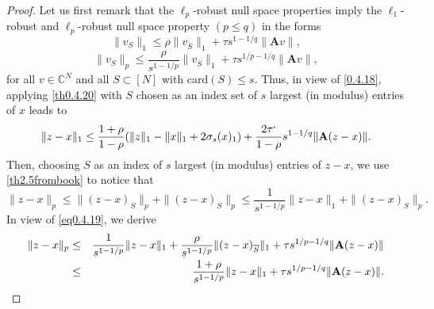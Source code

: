 \begin{proof}
    Let us first remark that the $\ell_p$-robust null space properties imply the $\ell_1$-robust and $\ell_p$-robust null space property $(p \leq q)$ in the forms
    \begin{equation}
        \|v_S\|_1 \leq \rho \|v_{\overline{S}}\|_1 + \tau s^{1-1/q}\|\mathbf{A}v\|,
        \label{eq0.4.18}
    \end{equation}
    \begin{equation}
        \|v_S\|_p \leq \frac{\rho}{s^{1-1/p}}\|v_{\overline{S}}\|_1 + \tau s^{1/p-1/q} \|\mathbf{A}v\|,
        \label{eq0.4.19}
    \end{equation}
    for all $v \in \mathbb{C}^N$ and all $S \subset [N]$ with card$(S) \leq s$. Thus, in view of \cref{0.4.18}, applying \cref{th0.4.20} with $S$ chosen as an index set of $s$ largest (in modulus) entries of $x$ leads to 
    \begin{equation}
         \|z-x\|_1 \leq \frac{1+\rho}{1-\rho}(\|z\|_1 - \|x\|_1 + 2\sigma_s(x)_1) + \frac{2\tau`}{1-\rho}s^{1-1/q} \|\mathbf{A}(z-x)\|.
        \label{eq0.4.20}
    \end{equation}
    Then, choosing $S$ as an index of $s$ largest (in modulus) entries of $z-x$, we use \cref{th2.5frombook} to notice that
    \[
        \|z-x\|_p \leq \|(z-x)_{\overline{S}}\|_p + \|(z-x)_S\|_p \leq \frac{1}{s^{1-1/p}} \|z-x\|_1 + \|(z-x)_S\|_p.
    \]
    In view of \cref{eq0.4.19}, we derive
    \begin{eqnarray}
        \label{eq0.4.21}
        \|z-x\|_p &\leq& \frac{1}{s^{1-1/p}} \|z-x\|_1 + \frac{\rho}{s^{1-1/p}} \|(z-x)_{\overline{S}}\|_1 + \tau s^{1/p-1/q} \|\mathbf{A}(z-x)\| \notag \\
        &\leq& \frac{1+\rho}{s^{1-1/p}} \|z-x\|_1 + \tau s^{1/p-1/q} \|\mathbf{A}(z-x)\|.
    \end{eqnarray}
\end{proof}

